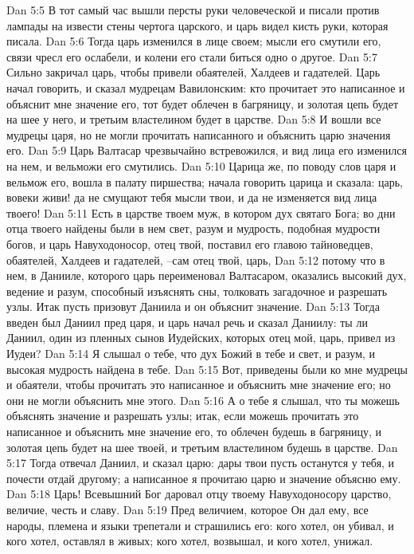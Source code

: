 Dan 5:5  В тот самый час вышли персты руки человеческой и писали против лампады на извести стены чертога царского, и царь видел кисть руки, которая писала.
Dan 5:6  Тогда царь изменился в лице своем; мысли его смутили его, связи чресл его ослабели, и колени его стали биться одно о другое.
Dan 5:7  Сильно закричал царь, чтобы привели обаятелей, Халдеев и гадателей. Царь начал говорить, и сказал мудрецам Вавилонским: кто прочитает это написанное и объяснит мне значение его, тот будет облечен в багряницу, и золотая цепь будет на шее у него, и третьим властелином будет в царстве.
Dan 5:8  И вошли все мудрецы царя, но не могли прочитать написанного и объяснить царю значения его.
Dan 5:9  Царь Валтасар чрезвычайно встревожился, и вид лица его изменился на нем, и вельможи его смутились.
Dan 5:10  Царица же, по поводу слов царя и вельмож его, вошла в палату пиршества; начала говорить царица и сказала: царь, вовеки живи! да не смущают тебя мысли твои, и да не изменяется вид лица твоего!
Dan 5:11  Есть в царстве твоем муж, в котором дух святаго Бога; во дни отца твоего найдены были в нем свет, разум и мудрость, подобная мудрости богов, и царь Навуходоносор, отец твой, поставил его главою тайноведцев, обаятелей, Халдеев и гадателей, --сам отец твой, царь,
Dan 5:12  потому что в нем, в Данииле, которого царь переименовал Валтасаром, оказались высокий дух, ведение и разум, способный изъяснять сны, толковать загадочное и разрешать узлы. Итак пусть призовут Даниила и он объяснит значение.
Dan 5:13  Тогда введен был Даниил пред царя, и царь начал речь и сказал Даниилу: ты ли Даниил, один из пленных сынов Иудейских, которых отец мой, царь, привел из Иудеи?
Dan 5:14  Я слышал о тебе, что дух Божий в тебе и свет, и разум, и высокая мудрость найдена в тебе.
Dan 5:15  Вот, приведены были ко мне мудрецы и обаятели, чтобы прочитать это написанное и объяснить мне значение его; но они не могли объяснить мне этого.
Dan 5:16  А о тебе я слышал, что ты можешь объяснять значение и разрешать узлы; итак, если можешь прочитать это написанное и объяснить мне значение его, то облечен будешь в багряницу, и золотая цепь будет на шее твоей, и третьим властелином будешь в царстве.
Dan 5:17  Тогда отвечал Даниил, и сказал царю: дары твои пусть останутся у тебя, и почести отдай другому; а написанное я прочитаю царю и значение объясню ему.
Dan 5:18  Царь! Всевышний Бог даровал отцу твоему Навуходоносору царство, величие, честь и славу.
Dan 5:19  Пред величием, которое Он дал ему, все народы, племена и языки трепетали и страшились его: кого хотел, он убивал, и кого хотел, оставлял в живых; кого хотел, возвышал, и кого хотел, унижал.

